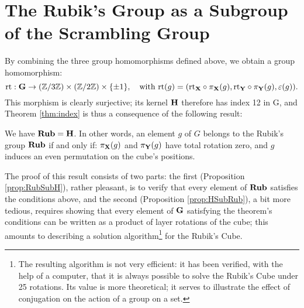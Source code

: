 \section{The Rubik's Group as a Subgroup of the Scrambling Group}

By combining the three group homomorphisms defined above, we obtain a group homomorphism:
$$
\mathrm{rt} : \mathbf{G} \to (\mathbb{Z} / 3 \mathbb{Z}) \times (\mathbb{Z} / 2 \mathbb{Z}) \times \{\pm 1\}, \quad\text{with } \mathrm{rt}(g) = (\mathrm{rt}_{\mathbf{X}} \circ \pi_{\mathbf{X}}(g), \mathrm{rt}_{\mathbf{Y}} \circ \pi_{\mathbf{Y}}(g), \varepsilon(g)).
$$
This morphism is clearly surjective; its kernel $\mathbf{H}$ therefore has index 12 in G, and Theorem \ref{thm:index} is thus a consequence of the following result:

\begin{theorem}
    \label{thm:RubH}
    We have $\mathbf{Rub} = \mathbf{H}$. In other words, an element $g$ of $G$ belongs to the Rubik's group $\mathbf{Rub}$ if and only if:
    $\pi_{\mathbf{X}}(g)$ and $\pi_{\mathbf{Y}}(g)$ have total rotation zero, and $g$ induces an even permutation on the cube's positions.
\end{theorem}

The proof of this result consists of two parts:
the first (Proposition \ref{prop:RubSubH}), rather pleasant, is to verify that every element of $\mathbf{Rub}$ satisfies the conditions above,
and the second (Proposition \ref{prop:HSubRub}), a bit more tedious, requires showing that every element of $\mathbf{G}$ satisfying the theorem's conditions can be written as a product of layer rotations of the cube; this amounts to describing a solution algorithm\footnote{The resulting algorithm is not very efficient: it has been verified, with the help of a computer, that it is always possible to solve the Rubik's Cube under 25 rotations. Its value is more theoretical; it serves to illustrate the effect of conjugation on the action of a group on a set.} for the Rubik's Cube.

